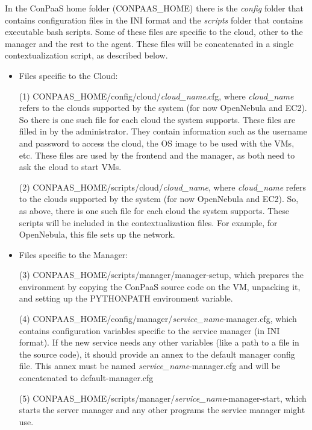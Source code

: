 \documentclass[10pt]{article}
\begin{document}
In the ConPaaS home folder (\textdollar CONPAAS\_HOME) there is the \textit{config} folder that contains configuration files in the INI format and the \textit{scripts} folder that contains executable bash scripts. Some of these files are specific to the cloud, other to the manager and the rest to the agent. These files will be concatenated in a single contextualization script, as described below.

\begin{itemize}
\item Files specific to the Cloud:

(1) \textdollar CONPAAS\_HOME/config/cloud/\textit{cloud\_name}.cfg, where \textit{cloud\_name} refers to the clouds supported by the system (for now OpenNebula and EC2). So there is one such file for each cloud the system supports. These files are filled in by the administrator. They contain information such as the username and password to access the cloud, the OS image to be used with the VMs, etc. These files are used by the frontend and the manager, as both need to ask the cloud to start VMs. 

(2) \textdollar CONPAAS\_HOME/scripts/cloud/\textit{cloud\_name}, where \textit{cloud\_name} refers to the clouds supported by the system (for now OpenNebula and EC2). So, as above, there is one such file for each cloud the system supports. These scripts will be included in the contextualization files. For example, for OpenNebula, this file sets up the network. 

\item Files specific to the Manager:

(3) \textdollar CONPAAS\_HOME/scripts/manager/manager-setup, which prepares the environment by copying the ConPaaS source code on the VM, unpacking it, and setting up the PYTHONPATH environment variable.

(4) \textdollar CONPAAS\_HOME/config/manager/\textit{service\_name}-manager.cfg, which contains configuration variables specific to the service manager (in INI format). If the new service needs any other variables (like a path to a file in the source code), it should provide an annex to the default manager config file. This annex must be named \textit{service\_name}-manager.cfg and will be concatenated to default-manager.cfg

(5) \textdollar CONPAAS\_HOME/scripts/manager/\textit{service\_name}-manager-start, which starts the server manager and any other programs the service manager might use. 


\end{itemize}
\end{document}
